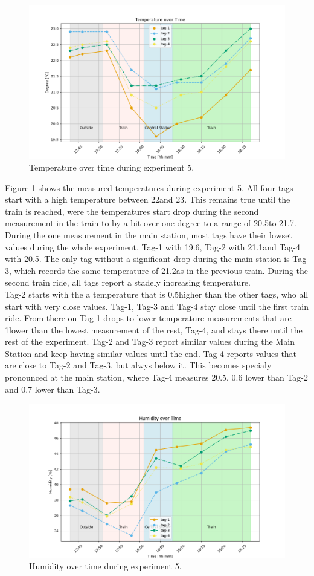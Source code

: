 \begin{figure}[ht!]
	\includegraphics[width=\linewidth]{graphics/exp/exp6_temp_plot_2.png}
	\caption{Temperature over time during experiment 5.}
	\label{f:ex5_train_temp}
\end{figure}

Figure \ref{f:ex5_train_temp} shows the measured temperatures during experiment 5.
All four tags start with a high temperature between 22\degree and 23\degree .
This remains true until the train is reached, were the temperatures start drop during the second measurement in the train to by a bit over one degree to a range of 20.5\degree to 21.7\degree .
During the one measurement in the main station, most tags have their lowset values during the whole experiment, Tag-1 with 19.6\degree , Tag-2 with 21.1\degree and Tag-4 with 20.5\degree .
The only tag without a significant drop during the main station is Tag-3, which records the same temperature of 21.2\degree as in the previous train.
During the second train ride, all tags report a stadely increasing temperature. \\
Tag-2 starts with the a temperature that is 0.5\degree higher than the other tags, who all start with very close values.
Tag-1, Tag-3 and Tag-4 stay close until the first train ride.
From there on Tag-1 drops to lower temperature measurements that are 1\degree lower than the lowest measurement of the rest, Tag-4, and stays there until the rest of the experiment.
Tag-2 and Tag-3 report similar values during the Main Station and keep having similar values until the end.
Tag-4 reports values that are close to Tag-2 and Tag-3, but alwys below it. This becomes specialy pronounced at the main station, where Tag-4 measures 20.5\degree , 0.6 \degree lower than Tag-2 and 0.7 \degree lower than Tag-3.




\begin{figure}[ht!]
	\includegraphics[width=\linewidth]{graphics/exp/exp6_hum_plot_2.png}
	\caption{Humidity over time during experiment 5.}
	\label{f:ex5_train_hum}
\end{figure}